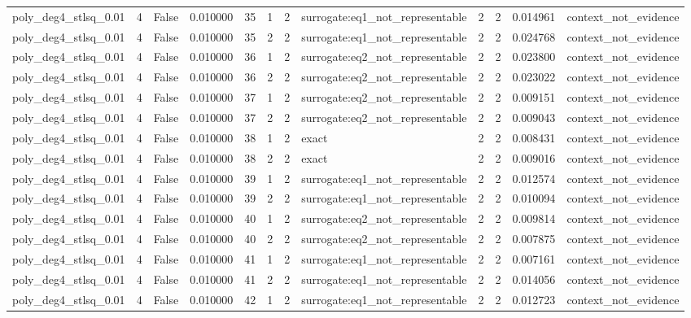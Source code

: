 \begin{tabular}{lrrrrrrlrrrl}
poly\_deg4\_stlsq\_0.01 & 4 & False & 0.010000 & 35 & 1 & 2 & surrogate:eq1\_not\_representable & 2 & 2 & 0.014961 & context\_not\_evidence \\
poly\_deg4\_stlsq\_0.01 & 4 & False & 0.010000 & 35 & 2 & 2 & surrogate:eq1\_not\_representable & 2 & 2 & 0.024768 & context\_not\_evidence \\
poly\_deg4\_stlsq\_0.01 & 4 & False & 0.010000 & 36 & 1 & 2 & surrogate:eq2\_not\_representable & 2 & 2 & 0.023800 & context\_not\_evidence \\
poly\_deg4\_stlsq\_0.01 & 4 & False & 0.010000 & 36 & 2 & 2 & surrogate:eq2\_not\_representable & 2 & 2 & 0.023022 & context\_not\_evidence \\
poly\_deg4\_stlsq\_0.01 & 4 & False & 0.010000 & 37 & 1 & 2 & surrogate:eq2\_not\_representable & 2 & 2 & 0.009151 & context\_not\_evidence \\
poly\_deg4\_stlsq\_0.01 & 4 & False & 0.010000 & 37 & 2 & 2 & surrogate:eq2\_not\_representable & 2 & 2 & 0.009043 & context\_not\_evidence \\
poly\_deg4\_stlsq\_0.01 & 4 & False & 0.010000 & 38 & 1 & 2 & exact & 2 & 2 & 0.008431 & context\_not\_evidence \\
poly\_deg4\_stlsq\_0.01 & 4 & False & 0.010000 & 38 & 2 & 2 & exact & 2 & 2 & 0.009016 & context\_not\_evidence \\
poly\_deg4\_stlsq\_0.01 & 4 & False & 0.010000 & 39 & 1 & 2 & surrogate:eq1\_not\_representable & 2 & 2 & 0.012574 & context\_not\_evidence \\
poly\_deg4\_stlsq\_0.01 & 4 & False & 0.010000 & 39 & 2 & 2 & surrogate:eq1\_not\_representable & 2 & 2 & 0.010094 & context\_not\_evidence \\
poly\_deg4\_stlsq\_0.01 & 4 & False & 0.010000 & 40 & 1 & 2 & surrogate:eq2\_not\_representable & 2 & 2 & 0.009814 & context\_not\_evidence \\
poly\_deg4\_stlsq\_0.01 & 4 & False & 0.010000 & 40 & 2 & 2 & surrogate:eq2\_not\_representable & 2 & 2 & 0.007875 & context\_not\_evidence \\
poly\_deg4\_stlsq\_0.01 & 4 & False & 0.010000 & 41 & 1 & 2 & surrogate:eq1\_not\_representable & 2 & 2 & 0.007161 & context\_not\_evidence \\
poly\_deg4\_stlsq\_0.01 & 4 & False & 0.010000 & 41 & 2 & 2 & surrogate:eq1\_not\_representable & 2 & 2 & 0.014056 & context\_not\_evidence \\
poly\_deg4\_stlsq\_0.01 & 4 & False & 0.010000 & 42 & 1 & 2 & surrogate:eq1\_not\_representable & 2 & 2 & 0.012723 & context\_not\_evidence \\

\end{tabular}
